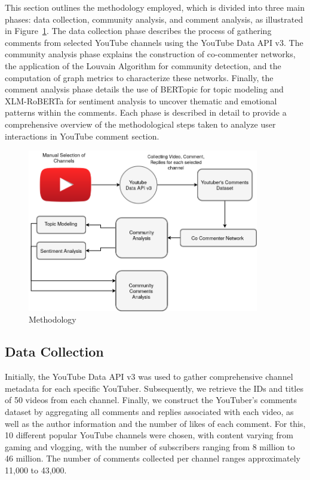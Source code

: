 \documentclass[12pt]{article}
\begin{document}
This section outlines the methodology employed, which is divided into three main phases: 
data collection, community analysis, and comment analysis, as illustrated in Figure~\ref{fig:methodology}. 
The data collection phase describes the process of gathering comments from selected YouTube channels 
using the YouTube Data API v3. The community analysis phase explains the construction of co-commenter 
networks, the application of the Louvain Algorithm for community detection, and the computation of 
graph metrics to characterize these networks. Finally, the comment analysis phase details the use of 
BERTopic for topic modeling and XLM-RoBERTa for sentiment analysis to uncover thematic and emotional 
patterns within the comments. Each phase is described in detail to provide a comprehensive overview 
of the methodological steps taken to analyze user interactions in YouTube comment section.

\begin{figure}[t!]
    \centering
    \includegraphics[keepaspectratio,width=0.9\textwidth]{./imgs/tcc_methodology.png}
    \caption[width=\textwidth]{Methodology}
    \label{fig:methodology}
\end{figure}

\subsection{Data Collection}

Initially, the YouTube Data API v3 was used to gather comprehensive channel metadata for each 
specific YouTuber. Subsequently, we retrieve the IDs and titles of 50 videos from each channel. 
Finally, we construct the YouTuber's comments dataset by aggregating all comments and replies 
associated with each video, as well as the author information and the number of likes of each comment. 
For this, 10 different popular YouTube channels were chosen, with content varying from gaming and 
vlogging, with the number of subscribers ranging from 8 million to 46 million. The number of comments
collected per channel ranges approximately 11,000 to 43,000.
\end{document}
